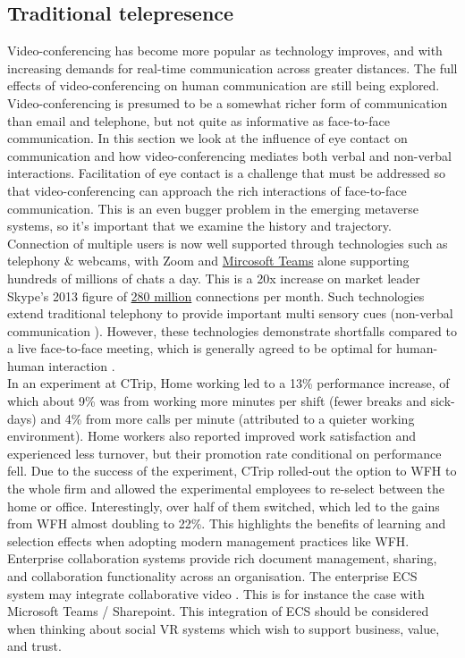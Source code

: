 \subsection{Traditional telepresence}
Video-conferencing has become more popular as technology improves, and with increasing demands for real-time communication across greater distances. The full effects of video-conferencing on human communication are still being explored. Video-conferencing is presumed to be a somewhat richer form of communication than email and telephone, but not quite as informative as face-to-face communication. In this section we look at the influence of eye contact on communication and how video-conferencing mediates both verbal and non-verbal interactions. Facilitation of eye contact is a challenge that must be addressed so that video-conferencing can approach the rich interactions of face-to-face communication. This is an even bugger problem in the emerging metaverse systems, so it's important that we examine the history and trajectory.\\
Connection of multiple users is now well supported through technologies such as telephony \& webcams, with Zoom and \href{https://www.microsoft.com/en-us/Investor/earnings/FY-2021-Q1/press-release-webcast}{Mircosoft Teams} alone supporting hundreds of millions of chats a day. This is a 20x increase on market leader Skype's 2013 figure of \href{https://www.microsoft.com/en-us/Investor/earnings/FY-2013-Q1/press-release-webcast}{280 million} connections per month. Such technologies extend traditional telephony to provide important multi sensory cues (non-verbal communication \cite{Argyle1976, Wolff2008}).  However, these technologies demonstrate shortfalls compared to a live face-to-face meeting, which is generally agreed to be optimal for human-human interaction \cite{Wolff2008, 2002}.\\
In an experiment at CTrip, Home working led to a 13\% performance increase, of which about 9\% was from working more minutes per shift (fewer breaks and sick-days) and 4\% from more calls per minute (attributed to a quieter working environment). Home workers also reported improved work satisfaction and experienced less turnover, but their promotion rate conditional on performance fell. Due to the success of the experiment, CTrip rolled-out the option to WFH to the whole firm and allowed the experimental employees to re-select between the home or office. Interestingly, over half of them switched, which led to the gains from WFH almost doubling to 22\%. This highlights the benefits of learning and selection effects when adopting modern management practices like WFH.\\
Enterprise collaboration systems provide rich document management, sharing, and collaboration functionality across an organisation. The enterprise ECS system may integrate collaborative video \cite{prakash2020characteristic}. This is for instance the case with Microsoft Teams / Sharepoint. This integration of ECS should be considered when thinking about social VR systems which wish to support business, value, and trust.\\
